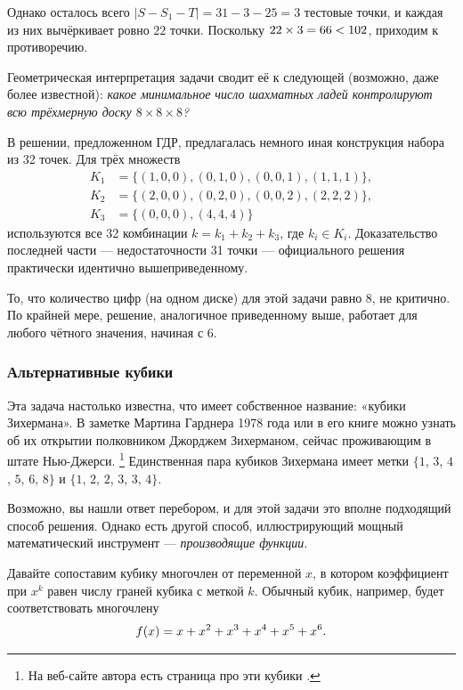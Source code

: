Однако осталось всего $|S - S_1 - T | = 31 - 3 - 25 = 3$ тестовые точки, и каждая из них вычёркивает ровно $22$ точки.
Поскольку $22 \times 3 = 66 \z< 102$, приходим к противоречию. 

\begin{addedbytheeditors}
Геометрическая интерпретация задачи сводит её к следующей (возможно, даже более известной):
\textit{какое минимальное число шахматных ладей контролируют всю трёхмерную доску $8\times8\times8$?}

В решении, предложенном ГДР, предлагалась немного иная конструкция набора из 32 точек.
Для трёх множеств
\begin{align*}
K_1&=\{(1,0,0), (0,1,0),(0,0,1),(1,1,1)\},
\\
K_2&=\{(2,0,0), (0,2,0),(0,0,2),(2,2,2)\},
\\
K_3&=\{(0,0,0), (4,4,4)\}
\end{align*}
используются все 32 комбинации $k=k_1+k_2+k_3$, где $k_i\in K_i$.
Доказательство последней части --- недостаточности 31 точки --- официального решения практически идентично вышеприведенному.

То, что количество цифр (на одном диске) для этой задачи равно 8, не критично. По крайней мере, решение, аналогичное приведенному выше, работает для любого чётного значения, начиная с 6.
\end{addedbytheeditors}

\subsubsection*{Альтернативные кубики}

Эта задача настолько известна, что имеет собственное название: «кубики Зихермана».
В заметке Мартина Гарднера 1978 года \cite{25} или в его книге \cite{28} можно узнать об их открытии полковником Джорджем Зихерманом, сейчас проживающим в штате Нью-Джерси.%
\footnote{На веб-сайте автора есть страница про эти кубики \cite{sicherman}. \pr}
Единственная пара кубиков Зихермана имеет метки $\{1$, $3$, $4$, $5$, $6$, $8\}$ и $\{1$, $2$, $2$, $3$, $3$, $4\}$.

Возможно, вы нашли ответ перебором, и для этой задачи это вполне подходящий способ решения.
Однако есть другой способ, иллюстрирующий мощный математический инструмент --- \emph{производящие функции}.

Давайте сопоставим кубику многочлен от переменной $x$, в котором коэффициент при $x^k$ равен числу граней кубика с меткой $k$.
Обычный кубик, например, будет соответствовать многочлену 
\[f(x) \z= x \z+ x^2 \z+ x^3 \z+ x^4 \z+ x^5 \z+ x^6.\]

